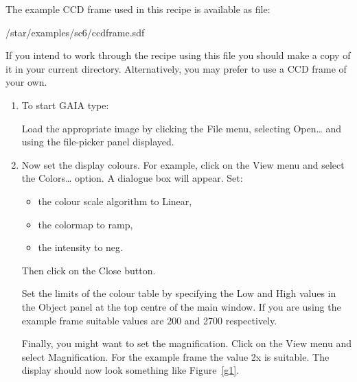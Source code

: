\documentclass[twoside,11pt,nolof]{starlink}
\begin{document}
The example CCD frame used in this recipe is available as file:

\begin{terminalv}
/star/examples/sc6/ccdframe.sdf
\end{terminalv}

If you intend to work through the recipe using this file you should make
a copy of it in your current directory.  Alternatively, you may prefer
to use a CCD frame of your own.

\begin{enumerate}

  \item To start GAIA type:

\begin{terminalv}
\end{terminalv}

   Load the appropriate image by clicking the \textsf{File} menu,
   selecting \textsf{Open\ldots} and using the file-picker panel displayed.

  \item Now set the display colours.  For example, click on the \textsf{View} menu and select the \textsf{Colors\ldots} option.  A dialogue box
   will appear.  Set:

  \begin{itemize}

    \item the colour scale algorithm to \textsf{Linear},

    \item the colormap to \textsf{ramp},

    \item the intensity to \textsf{neg}.

  \end{itemize}

   Then click on the \textsf{Close} button.

   Set the limits of the colour table by specifying the \textsf{Low} and
   \textsf{High} values in the \textsf{Object} panel at the top centre of the
   main window.  If you are using the example frame suitable values are
   200 and 2700 respectively.

   Finally, you might want to set the magnification.  Click on the \textsf{View} menu and select \textsf{Magnification}.  For the example frame
   the value \textsf{2x} is suitable.  The display should now look something
   like Figure~\ref{g1}.


\end{enumerate}
\end{document}
